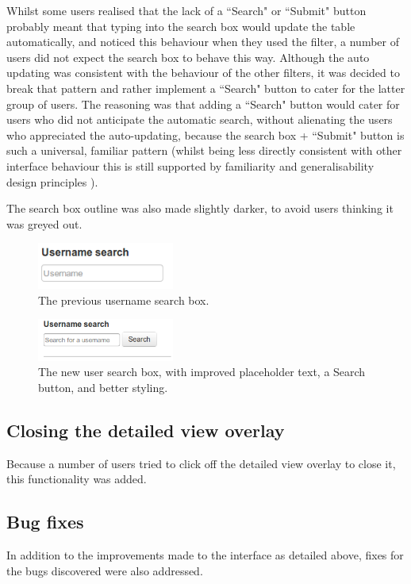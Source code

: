 Whilst some users realised that the lack of a ``Search" or ``Submit" button probably meant that typing into the search box would update the table automatically, and noticed this behaviour when they used the filter, a number of users did not expect the search box to behave this way. Although the auto updating was consistent with the behaviour of the other filters, it was decided to break that pattern and rather implement a ``Search" button to cater for the latter group of users. The reasoning was that adding a ``Search" button would cater for users who did not anticipate the automatic search, without alienating the users who appreciated the auto-updating, because the search box + ``Submit" button is such a universal, familiar pattern (whilst being less directly consistent with other interface behaviour this is still supported by familiarity and generalisability design principles \citep[p. 264]{DixFinlay}). 

The search box outline was also made slightly darker, to avoid users thinking it was greyed out.

\begin{figure}[h!]
    \centering
    \includegraphics[width=0.4\textwidth]{Figures/V2/usernameold.png}
 \caption{The previous username search box.}
\end{figure}

\begin{figure}[h!]
    \centering
    \includegraphics[width=0.4\textwidth]{Figures/V2/usernamenew.png}
 \caption{The new user search box, with improved placeholder text, a Search button, and better styling.}
\end{figure}


\subsection{Closing the detailed view overlay}
Because a number of users tried to click off the detailed view overlay to close it, this functionality was added. 

\subsection{Bug fixes}
In addition to the improvements made to the interface as detailed above, fixes for the bugs discovered were also addressed. 

